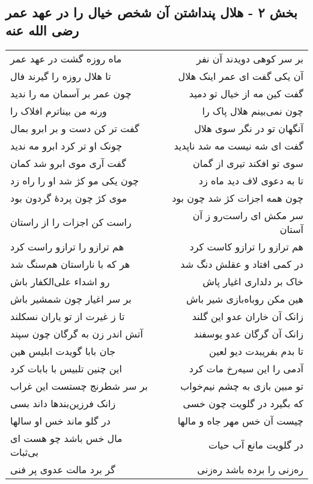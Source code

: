 \begin{center}
\section*{بخش ۲ - هلال پنداشتن آن شخص خیال را در عهد عمر رضی الله عنه}
\label{sec:sh002}
\begin{longtable}{l p{0.5cm} r}
ماه روزه گشت در عهد عمر
&&
بر سر کوهی دویدند آن نفر
\\
تا هلال روزه را گیرند فال
&&
آن یکی گفت ای عمر اینک هلال
\\
چون عمر بر آسمان مه را ندید
&&
گفت کین مه از خیال تو دمید
\\
ورنه من بیناترم افلاک را
&&
چون نمی‌بینم هلال پاک را
\\
گفت تر کن دست و بر ابرو بمال
&&
آنگهان تو در نگر سوی هلال
\\
چونک او تر کرد ابرو مه ندید
&&
گفت ای شه نیست مه شد ناپدید
\\
گفت آری موی ابرو شد کمان
&&
سوی تو افکند تیری از گمان
\\
چون یکی مو کژ شد او را راه زد
&&
تا به دعوی لاف دید ماه زد
\\
موی کژ چون پردهٔ گردون بود
&&
چون همه اجزات کژ شد چون بود
\\
راست کن اجزات را از راستان
&&
سر مکش ای راست‌رو ز آن آستان
\\
هم ترازو را ترازو راست کرد
&&
هم ترازو را ترازو کاست کرد
\\
هر که با ناراستان هم‌سنگ شد
&&
در کمی افتاد و عقلش دنگ شد
\\
رو اشداء علی‌الکفار باش
&&
خاک بر دلداری اغیار پاش
\\
بر سر اغیار چون شمشیر باش
&&
هین مکن روباه‌بازی شیر باش
\\
تا ز غیرت از تو یاران نسکلند
&&
زانک آن خاران عدو این گلند
\\
آتش اندر زن به گرگان چون سپند
&&
زانک آن گرگان عدو یوسفند
\\
جان بابا گویدت ابلیس هین
&&
تا بدم بفریبدت دیو لعین
\\
این چنین تلبیس با بابات کرد
&&
آدمی را این سیه‌رخ مات کرد
\\
بر سر شطرنج چستست این غراب
&&
تو مبین بازی به چشم نیم‌خواب
\\
زانک فرزین‌بندها داند بسی
&&
که بگیرد در گلویت چون خسی
\\
در گلو ماند خس او سالها
&&
چیست آن خس مهر جاه و مالها
\\
مال خس باشد چو هست ای بی‌ثبات
&&
در گلویت مانع آب حیات
\\
گر برد مالت عدوی پر فنی
&&
ره‌زنی را برده باشد ره‌زنی
\\
\end{longtable}
\end{center}
